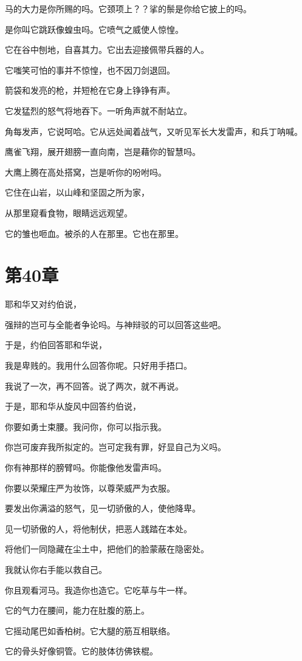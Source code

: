 \documentclass[12pt,oneside]{book}
\begin{document}
马的大力是你所赐的吗。它颈项上？？挲的鬃是你给它披上的吗。

是你叫它跳跃像蝗虫吗。它喷气之威使人惊惶。

它在谷中刨地，自喜其力。它出去迎接佩带兵器的人。

它嗤笑可怕的事并不惊惶，也不因刀剑退回。

箭袋和发亮的枪，并短枪在它身上铮铮有声。

它发猛烈的怒气将地吞下。一听角声就不耐站立。

角每发声，它说呵哈。它从远处闻着战气，又听见军长大发雷声，和兵丁呐喊。

鹰雀飞翔，展开翅膀一直向南，岂是藉你的智慧吗。

大鹰上腾在高处搭窝，岂是听你的吩咐吗。

它住在山岩，以山峰和坚固之所为家，

从那里窥看食物，眼睛远远观望。

它的雏也咂血。被杀的人在那里。它也在那里。


\chapter{第40章}
耶和华又对约伯说，

强辩的岂可与全能者争论吗。与神辩驳的可以回答这些吧。

于是，约伯回答耶和华说，

我是卑贱的。我用什么回答你呢。只好用手捂口。

我说了一次，再不回答。说了两次，就不再说。

于是，耶和华从旋风中回答约伯说，

你要如勇士束腰。我问你，你可以指示我。

你岂可废弃我所拟定的。岂可定我有罪，好显自己为义吗。

你有神那样的膀臂吗。你能像他发雷声吗。

你要以荣耀庄严为妆饰，以尊荣威严为衣服。

要发出你满溢的怒气，见一切骄傲的人，使他降卑。

见一切骄傲的人，将他制伏，把恶人践踏在本处。

将他们一同隐藏在尘土中，把他们的脸蒙蔽在隐密处。

我就认你右手能以救自己。

你且观看河马。我造你也造它。它吃草与牛一样。

它的气力在腰间，能力在肚腹的筋上。

它摇动尾巴如香柏树。它大腿的筋互相联络。

它的骨头好像铜管。它的肢体彷佛铁棍。
\end{document}

